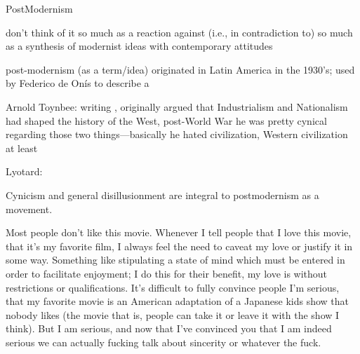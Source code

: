 \documentclass[../butidigress.tex]{subfiles}
\newcounter{worldwarcounter}\setcounter{worldwarcounter}{1}
\begin{document}
\setcounter{worldwarcounter}{2}
\begin{somenotes}{PostModernism}
    \item don't think of it so much as a reaction against (i.e., in contradiction to) so much as a synthesis of modernist ideas with contemporary attitudes
    \item post-modernism (as a term/idea) originated in Latin America in the 1930's; used by Federico de Onís to describe a \autocite[4]{originspostmodernity}
    \item Arnold Toynbee: writing , originally argued that Industrialism and Nationalism had shaped the history of the West, post-World War  he was pretty cynical regarding those two things---basically he hated civilization, Western civilization at least
    \item Lyotard: \autocite{postmodernsep}
\end{somenotes}

Cynicism and general disillusionment are integral to postmodernism as a movement.




Most people don't like this movie.
Whenever I tell people that I love this movie, that it's my favorite film, I always feel the need to caveat my love or justify it in some way.
Something like stipulating a state of mind which must be entered in order to facilitate enjoyment; I do this for their benefit, my love is without restrictions or qualifications.
It's difficult to fully convince people I'm serious, that my favorite movie is an American adaptation of a Japanese kids show that nobody likes (the movie that is, people can take it or leave it with the show I think).
But I am serious, and now that I've convinced you that I am indeed serious we can actually fucking talk about sincerity or whatever the fuck.
\end{document}
